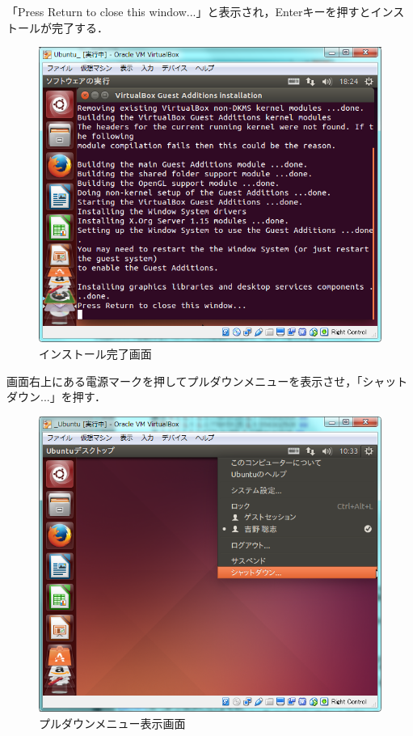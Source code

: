 「Press Return to close this window...」と表示され，Enterキーを押すとインストールが完了する．

\begin{figure}[H]
\centering
\includegraphics[width=13cm]{ubuntuguestadditionsinstallfinished.PNG}
\caption{インストール完了画面}\label{ubuntuguestadditionsinstallfinished}
\end{figure}

画面右上にある電源マークを押してプルダウンメニューを表示させ，「シャットダウン...」を押す．

\begin{figure}[H]
\centering
\includegraphics[width=13cm]{ubuntushutdown.PNG}
\caption{プルダウンメニュー表示画面}\label{ubuntushutdown}
\end{figure}

